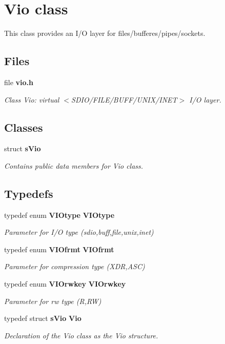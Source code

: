 \section{Vio class}
\label{a00028}


This class provides an I/\+O layer for files/bufferes/pipes/sockets.  


\subsection*{Files}
\begin{DoxyCompactItemize}
\item 
file {\bf vio.\+h}
\begin{DoxyCompactList}\small\item\em Class Vio\+: virtual $<$S\+D\+I\+O/\+F\+I\+L\+E/\+B\+U\+F\+F/\+U\+N\+I\+X/\+I\+N\+E\+T$>$ I/\+O layer. \end{DoxyCompactList}\end{DoxyCompactItemize}
\subsection*{Classes}
\begin{DoxyCompactItemize}
\item 
struct {\bf s\+Vio}
\begin{DoxyCompactList}\small\item\em Contains public data members for Vio class. \end{DoxyCompactList}\end{DoxyCompactItemize}
\subsection*{Typedefs}
\begin{DoxyCompactItemize}
\item 
typedef enum {\bf V\+I\+Otype} {\bf V\+I\+Otype}
\begin{DoxyCompactList}\small\item\em Parameter for I/\+O type (sdio,buff,file,unix,inet) \end{DoxyCompactList}\item 
typedef enum {\bf V\+I\+Ofrmt} {\bf V\+I\+Ofrmt}
\begin{DoxyCompactList}\small\item\em Parameter for compression type (X\+D\+R,A\+S\+C) \end{DoxyCompactList}\item 
typedef enum {\bf V\+I\+Orwkey} {\bf V\+I\+Orwkey}
\begin{DoxyCompactList}\small\item\em Parameter for rw type (R,R\+W) \end{DoxyCompactList}\item 
typedef struct {\bf s\+Vio} {\bf Vio}
\begin{DoxyCompactList}\small\item\em Declaration of the Vio class as the Vio structure. \end{DoxyCompactList}\end{DoxyCompactItemize}
